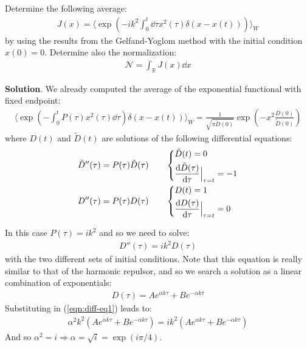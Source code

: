 \documentclass[../template.tex]{subfiles}
\begin{document}
\begin{exo}
    Determine the following average:
    \begin{align*}
        J(x) = \langle \exp\left(-ik^2 \int_0^t  \dd{\tau} x^2(\tau)\delta(x-x(t))\right) \rangle_W
    \end{align*}
    by using the results from the Gelfand-Yoglom method with the initial condition $x(0)=0$. Determine also the normalization:
    \begin{align*}
       \mathcal{N} = \int_{\mathbb{R}} J(x) \dd{x}
    \end{align*}

    \medskip

    \textbf{Solution}. We already computed the average of the exponential functional with fixed endpoint:
    \begin{align*}
        \langle \exp\left(-\int_0^t P(\tau) x^2(\tau) \dd{\tau}\right) \delta(x-x(t)) \rangle_W = \frac{1}{\sqrt{\pi \tilde{D}(0)}} \exp\left(-x^2 \frac{D(0)}{\tilde{D}(0)} \right)
    \end{align*}
    where $D(t)$ and $\tilde{D}(t)$ are solutions of the following differential equations:
    \begin{align*}
        \tilde{D}''(\tau) &= P(\tau) \tilde{D}(\tau) \qquad \begin{dcases}
            \tilde{D}(t) = 0\\
            \dv{\tilde{D}(\tau)}{\tau}\Big|_{\tau = t} = -1
        \end{dcases}\\
        D''(\tau) &= P(\tau) D(\tau) \qquad \begin{dcases}
            {D}(t) = 1\\
            \dv{{D}(\tau)}{\tau}\Big|_{\tau = t} = 0
        \end{dcases}
    \end{align*}

    In this case $P(\tau) = ik^2$ and so we need to solve:
    \begin{align}
        D''(\tau) = ik^2 D(\tau) \label{eqn:diff-eq1}
    \end{align}
    with the two different sets of initial conditions. Note that this equation is really similar to that of the harmonic repulsor, and so we search a solution as a linear combination of exponentials:
    \begin{align*}
        D(\tau) = A e^{\alpha k \tau } + B e^{-\alpha k \tau}
    \end{align*}
    Substituting in (\ref{eqn:diff-eq1}) leads to:
    \begin{align*}
        \alpha^2 k^2 (A e^{\alpha k \tau} + B e^{-\alpha k \tau}) = ik^2(A e^{\alpha k \tau} + B e^{-\alpha k \tau})
    \end{align*}
    And so $\alpha^2 = i \Rightarrow \alpha = \sqrt{i} = \exp(i \pi/4)$.


\end{exo}
\end{document}
